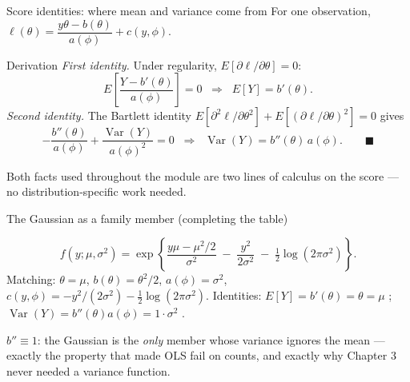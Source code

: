 \documentclass[aspectratio=169,11pt]{beamer}
\begin{document}
\begin{frame}{Score identities: where mean and variance come from}
  \footnotesize
  For one observation, $\ell(\theta) = \dfrac{y\theta - b(\theta)}{a(\phi)} + c(y,\phi)$.
  \begin{block}{Derivation}
    \emph{First identity.} Under regularity, $E\!\left[\partial\ell/\partial\theta\right] = 0$:
    \[
      E\!\left[\frac{Y - b'(\theta)}{a(\phi)}\right] = 0
      \;\;\Longrightarrow\;\; E[Y] = b'(\theta).
    \]
    \emph{Second identity.} The Bartlett identity
    $E\!\left[\partial^2\ell/\partial\theta^2\right]
     + E\!\left[(\partial\ell/\partial\theta)^2\right] = 0$ gives
    \[
      -\frac{b''(\theta)}{a(\phi)} + \frac{\operatorname{Var}(Y)}{a(\phi)^2} = 0
      \;\;\Longrightarrow\;\; \operatorname{Var}(Y) = b''(\theta)\,a(\phi). \qquad\blacksquare
    \]
  \end{block}
  \begin{takeaway}
    Both facts used throughout the module are two lines of calculus on the score ---
    no distribution-specific work needed.
  \end{takeaway}
\end{frame}

\begin{frame}{The Gaussian as a family member (completing the table)}
  \begin{numexample}
    \[
      f(y;\mu,\sigma^2)
      = \exp\!\left\{ \frac{y\mu - \mu^2/2}{\sigma^2}
        \;-\; \frac{y^2}{2\sigma^2} \;-\; \tfrac12\log(2\pi\sigma^2) \right\}.
    \]
    Matching: $\theta = \mu$, \; $b(\theta) = \theta^2/2$, \; $a(\phi) = \sigma^2$, \;
    $c(y,\phi) = -y^2/(2\sigma^2) - \tfrac12\log(2\pi\sigma^2)$.
    Identities: $E[Y] = b'(\theta) = \theta = \mu$ \checkmark;\;
    $\operatorname{Var}(Y) = b''(\theta)a(\phi) = 1\cdot\sigma^2$ \checkmark.
  \end{numexample}
  \begin{takeaway}
    $b'' \equiv 1$: the Gaussian is the \emph{only} member whose variance ignores the
    mean --- exactly the property that made OLS fail on counts, and exactly why
    Chapter 3 never needed a variance function.
  \end{takeaway}
\end{frame}
\end{document}

